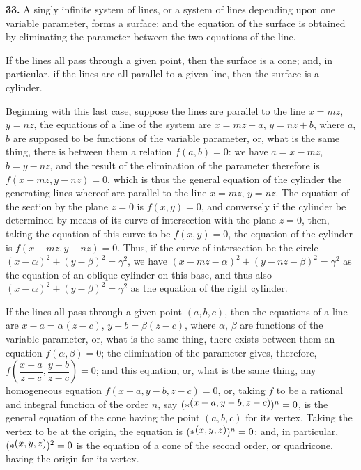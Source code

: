 \documentclass[11pt,a4paper]{article}
\theoremstyle{definition}
\begin{document}
\textbf{33.} A singly infinite system of lines, or a system of lines depending upon one variable parameter, forms a surface; and the equation of the surface is obtained by eliminating the parameter between the two equations of the line.

If the lines all pass through a given point, then the surface is a cone; and, in particular, if the lines are all parallel to a given line, then the surface is a cylinder.

Beginning with this last case, suppose the lines are parallel to the line $x=mz$, $y=nz$, the equations of a line of the system are $x=mz+a$, $y=nz+b$, where $a$, $b$ are supposed to be functions of the variable parameter, or, what is the same thing, there is between them a relation $f(a,b)=0$: we have $a=x-mz$, $b=y-nz$, and the result of the elimination of the parameter therefore is $f(x-mz, y-nz)=0$, which is thus the general equation of the cylinder the generating lines whereof are parallel to the line $x=mz$, $y=nz$. The equation of the section by the plane $z=0$ is $f(x,y)=0$, and conversely if the cylinder be determined by means of its curve of intersection with the plane $z=0$, then, taking the equation of this curve to be $f(x,y)=0$, the equation of the cylinder is $f(x-mz, y-nz)=0$. Thus, if the curve of intersection be the circle $(x-\alpha)^2+(y-\beta)^2=\gamma^2$, we have $(x-mz-\alpha)^2+(y-nz-\beta)^2=\gamma^2$ as the equation of an oblique cylinder on this base, and thus also $(x-\alpha)^2+(y-\beta)^2=\gamma^2$ as the equation of the right cylinder.

If the lines all pass through a given point $(a,b,c)$, then the equations of a line are $x-a=\alpha(z-c)$, $y-b=\beta(z-c)$, where $\alpha$, $\beta$ are functions of the variable parameter, or, what is the same thing, there exists between them an equation $f(\alpha,\beta)=0$; the elimination of the parameter gives, therefore, $f\left(\dfrac{x-a}{z-c}, \dfrac{y-b}{z-c}\right)=0$; and this equation, or, what is the same thing, any homogeneous equation $f(x-a, y-b, z-c)=0$, or, taking $f$ to be a rational and integral function of the order $n$, say $(*\,\raisebox{0.5ex}{\text{$\!(x-a,y-b,z-c)$}})^n=0$, is the general equation of the cone having the point $(a,b,c)$ for its vertex. Taking the vertex to be at the origin, the equation is $(*\,\raisebox{0.5ex}{\text{$\!(x,y,z)$}})^n=0$; and, in particular, $(*\,\raisebox{0.5ex}{\text{$\!(x,y,z)$}})^2=0$ is the equation of a cone of the second order, or quadricone, having the origin for its vertex.
\end{document}
